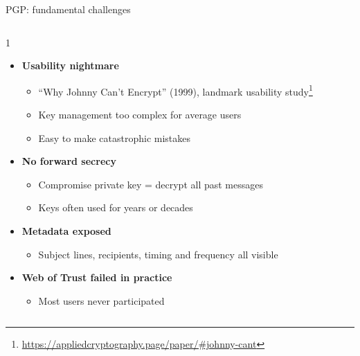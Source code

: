 \ifdefined\PRESENTATION\else\PassOptionsToClass{handout}{beamer}\fi\documentclass[aspectratio=169, lualatex]{beamer}
\begin{document}
\begin{frame}{PGP: fundamental challenges}
	\begin{columns}[c]
		\begin{column}{1\textwidth}
			\begin{itemize}
				\item \textbf{Usability nightmare}
				      \begin{itemize}
					      \item ``Why Johnny Can't Encrypt'' (1999), landmark usability study\footnote{\url{https://appliedcryptography.page/paper/\#johnny-cant}}
					      \item Key management too complex for average users
					      \item Easy to make catastrophic mistakes
				      \end{itemize}
				\item \textbf{No forward secrecy}
				      \begin{itemize}
					      \item Compromise private key = decrypt all past messages
					      \item Keys often used for years or decades
				      \end{itemize}
				\item \textbf{Metadata exposed}
				      \begin{itemize}
					      \item Subject lines, recipients, timing and frequency all visible
				      \end{itemize}
				\item \textbf{Web of Trust failed in practice}
				      \begin{itemize}
					      \item Most users never participated
				      \end{itemize}
			\end{itemize}
		\end{column}
	\end{columns}
\end{frame}
\end{document}
